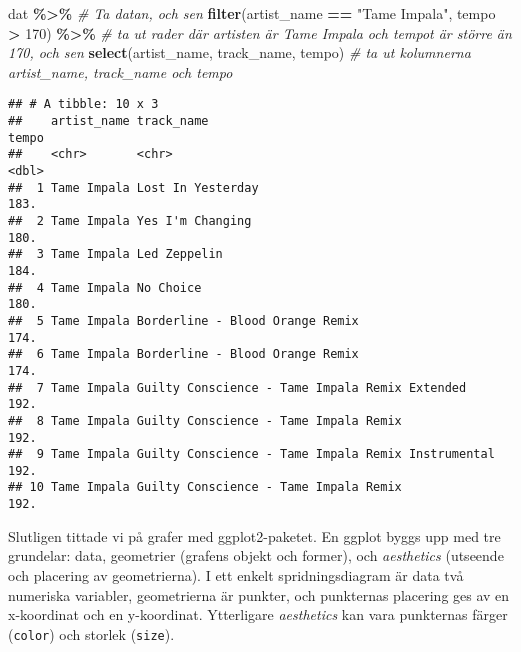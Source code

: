 \documentclass[
]{book}
\newenvironment{Shaded}{\begin{snugshade}}{\end{snugshade}}
\newcommand{\CommentTok}[1]{\textcolor[rgb]{0.56,0.35,0.01}{\textit{#1}}}
\newcommand{\DecValTok}[1]{\textcolor[rgb]{0.00,0.00,0.81}{#1}}
\newcommand{\FunctionTok}[1]{\textcolor[rgb]{0.13,0.29,0.53}{\textbf{#1}}}
\newcommand{\NormalTok}[1]{#1}
\newcommand{\SpecialCharTok}[1]{\textcolor[rgb]{0.81,0.36,0.00}{\textbf{#1}}}
\newcommand{\StringTok}[1]{\textcolor[rgb]{0.31,0.60,0.02}{#1}}
\theoremstyle{definition}
\theoremstyle{definition}
\theoremstyle{definition}
\theoremstyle{definition}
\theoremstyle{remark}
\begin{document}
\begin{Shaded}
\begin{Highlighting}[]
\NormalTok{dat }\SpecialCharTok{\%\textgreater{}\%}                                                    \CommentTok{\# Ta datan, och sen}
  \FunctionTok{filter}\NormalTok{(artist\_name }\SpecialCharTok{==} \StringTok{"Tame Impala"}\NormalTok{, tempo }\SpecialCharTok{\textgreater{}} \DecValTok{170}\NormalTok{) }\SpecialCharTok{\%\textgreater{}\%}    \CommentTok{\# ta ut rader där artisten är Tame Impala och tempot är större än 170, och sen}
  \FunctionTok{select}\NormalTok{(artist\_name, track\_name, tempo)                   }\CommentTok{\# ta ut kolumnerna artist\_name, track\_name och tempo}
\end{Highlighting}
\end{Shaded}

\begin{verbatim}
## # A tibble: 10 x 3
##    artist_name track_name                                         tempo
##    <chr>       <chr>                                              <dbl>
##  1 Tame Impala Lost In Yesterday                                   183.
##  2 Tame Impala Yes I'm Changing                                    180.
##  3 Tame Impala Led Zeppelin                                        184.
##  4 Tame Impala No Choice                                           180.
##  5 Tame Impala Borderline - Blood Orange Remix                     174.
##  6 Tame Impala Borderline - Blood Orange Remix                     174.
##  7 Tame Impala Guilty Conscience - Tame Impala Remix Extended      192.
##  8 Tame Impala Guilty Conscience - Tame Impala Remix               192.
##  9 Tame Impala Guilty Conscience - Tame Impala Remix Instrumental  192.
## 10 Tame Impala Guilty Conscience - Tame Impala Remix               192.
\end{verbatim}

Slutligen tittade vi på grafer med ggplot2-paketet. En ggplot byggs upp med tre grundelar: data, geometrier (grafens objekt och former), och \emph{aesthetics} (utseende och placering av geometrierna). I ett enkelt spridningsdiagram är data två numeriska variabler, geometrierna är punkter, och punkternas placering ges av en x-koordinat och en y-koordinat. Ytterligare \emph{aesthetics} kan vara punkternas färger (\texttt{color}) och storlek (\texttt{size}).
\end{document}
